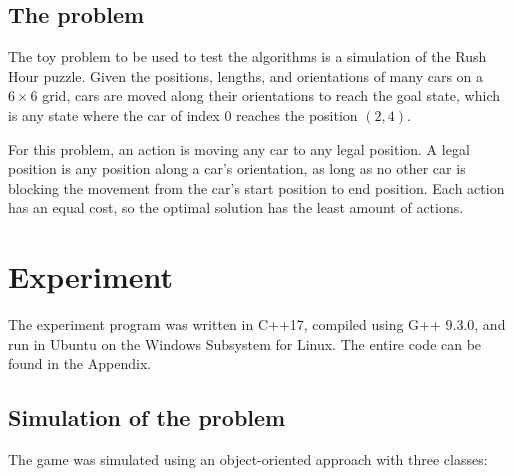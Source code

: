 \documentclass[12pt, a4paper]{article}
\begin{document}
\subsection{The problem}

The toy problem to be used to test the algorithms is a simulation of the Rush Hour puzzle. Given the positions, lengths, and orientations of many cars on a $6\times6$ grid, cars are moved along their orientations to reach the goal state, which is any state where the car of index 0 reaches the position $(2,4)$.

For this problem, an action is moving any car to any legal position. A legal position is any position along a car's orientation, as long as no other car is blocking the movement from the car's start position to end position. Each action has an equal cost, so the optimal solution has the least amount of actions.

\section{Experiment}

The experiment program was written in C++17, compiled using G++ 9.3.0, and run in Ubuntu on the Windows Subsystem for Linux. The entire code can be found in the Appendix. 

\subsection{Simulation of the problem}

The game was simulated using an object-oriented approach with three classes: 
\end{document}
